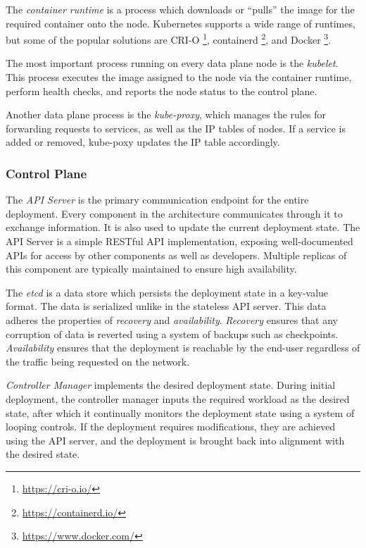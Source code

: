 The \textit{container runtime} is a process which downloads or ``pulls'' the image for the required container onto the node. Kubernetes supports a wide range of runtimes, but some of the popular solutions are CRI-O \footnote{\url{https://cri-o.io/}}, containerd \footnote{\url{https://containerd.io/}}, and Docker \footnote{\url{https://www.docker.com/}}.\par

The most important process running on every data plane node is the \textit{kubelet}. This process executes the image assigned to the node via the container runtime, perform health checks, and reports the node status to the control plane.\par

Another data plane process is the \textit{kube-proxy}, which manages the rules for forwarding requests to services, as well as the IP tables of nodes. If a service is added or removed, kube-poxy updates the IP table accordingly.\par

\subsubsection{Control Plane}
\label{subsubsec:k8s-control-plane}
The \textit{API Server} is the primary communication endpoint for the entire deployment. Every component in the architecture communicates through it to exchange information. It is also used to update the current deployment state. The API Server is a simple RESTful API implementation, exposing well-documented APIs for access by other components as well as developers. Multiple replicas of this component are typically maintained to ensure high availability.\par

The \textit{etcd} is a data store which persists the deployment state in a key-value format. The data is serialized unlike in the stateless API server. This data adheres the properties of \textit{recovery} and \textit{availability}. \textit{Recovery} ensures that any corruption of data is reverted using a system of backups such as checkpoints. \textit{Availability} ensures that the deployment is reachable by the end-user regardless of the traffic being requested on the network.\par

\textit{Controller Manager} implements the desired deployment state. During initial deployment, the controller manager inputs the required workload as the desired state, after which it continually monitors the deployment state using a system of looping controls. If the deployment requires modifications, they are achieved using the API server, and the deployment is brought back into alignment with the desired state.\par


